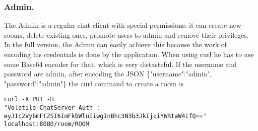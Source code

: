 \subsubsection{Admin.}
The Admin is a regular chat client with special permissions: it can create new rooms, delete existing ones, promote users to admin and remove their privileges. In the full version, the Admin can easily achieve this because the work of encoding his credentials is done by the application. When using curl he has to use some Base64 encoder for that, which is very distasteful. If the username and password are admin, after encoding the JSON \{"username":"admin", "password":"admin"\} the curl command to create a room is

\small\begin{verbatim}
curl -X PUT -H 
"Volatile-ChatServer-Auth : eyJ1c2VybmFtZSI6ImFkbWluIiwgInBhc3N3b3JkIjoiYWRtaW4ifQ==" 
localhost:8080/room/ROOM
\end{verbatim}


\normalsize
